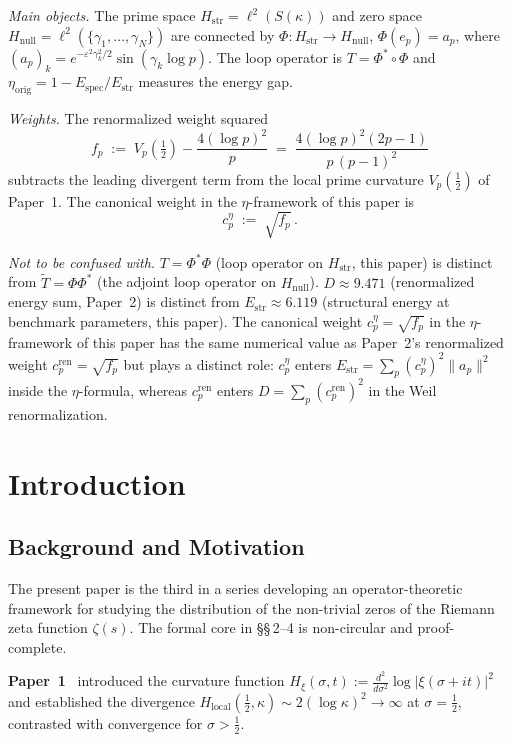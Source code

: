 \documentclass[11pt]{article}
\newcommand{\Hstr}{H_{\mathrm{str}}}
\newcommand{\Hnull}{H_{\mathrm{null}}}
\newcommand{\Estr}{E_{\mathrm{str}}}
\newcommand{\Espec}{E_{\mathrm{spec}}}
\newcommand{\etaorig}{\eta_{\mathrm{orig}}}
\newcommand{\Hlocal}{H_{\mathrm{local}}}
\newcommand{\cren}{c_p^{\mathrm{ren}}}
\newcommand{\ceta}{c_p^{\eta}}
\newcommand{\fp}{f_p}
\begin{document}
\medskip
\emph{Main objects.}
The prime space $\Hstr=\ell^2(S(\kappa))$ and zero space
$\Hnull=\ell^2(\{\gamma_1,\ldots,\gamma_N\})$ are connected by
$\Phi\colon\Hstr\to\Hnull$, $\Phi(e_p)=a_p$, where
$(a_p)_k=e^{-\varepsilon^2\gamma_k^2/2}\sin(\gamma_k\log p)$.
The loop operator is $T=\Phi^*\circ\Phi$ and
$\etaorig=1-\Espec/\Estr$ measures the energy gap.

\medskip
\emph{Weights.}
The renormalized weight squared
\[
  \fp \;:=\; V_p(\tfrac12) - \frac{4(\log p)^2}{p}
       \;=\; \frac{4(\log p)^2(2p-1)}{p\,(p-1)^2}
\]
subtracts the leading divergent term from the local prime curvature
$V_p(\tfrac12)$ of Paper~1. The canonical weight in the
$\eta$-framework of this paper is
\[
  \ceta \;:=\; \sqrt{\fp}\,.
\]

\medskip
\emph{Not to be confused with.}
$T=\Phi^*\Phi$ (loop operator on $\Hstr$, this paper) is distinct from
$\tilde T=\Phi\Phi^*$ (the adjoint loop operator on $\Hnull$).
$D\approx 9.471$ (renormalized energy sum, Paper~2) is distinct from
$\Estr\approx 6.119$ (structural energy at benchmark parameters,
this paper). The canonical weight $\ceta = \sqrt{\fp}$ in the
$\eta$-framework of this paper has the same numerical value as
Paper~2's renormalized weight $\cren = \sqrt{\fp}$ but plays a
distinct role: $\ceta$ enters $\Estr=\sum_p (\ceta)^{2}\|a_p\|^2$
inside the $\eta$-formula, whereas $\cren$ enters
$D=\sum_p (\cren)^{2}$ in the Weil renormalization.

\newpage

\section{Introduction}

\subsection{Background and Motivation}

The present paper is the third in a series developing an
operator-theoretic framework for studying the distribution of the
non-trivial zeros of the Riemann zeta function $\zeta(s)$.
The formal core in \S\S\,2--4 is non-circular and proof-complete.

\textbf{Paper~1}~\cite{Paper1} introduced the curvature function
$H_{\xi}(\sigma,t) := \frac{d^2}{d\sigma^2}\log|\xi(\sigma+it)|^2$
and established the divergence
$\Hlocal(\tfrac12,\kappa)\sim 2(\log\kappa)^2\to\infty$ at
$\sigma=\tfrac12$, contrasted with convergence for $\sigma>\tfrac12$.
\end{document}
